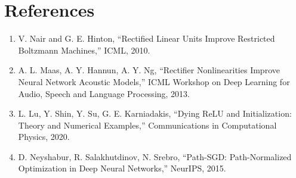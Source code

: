 \documentclass[10pt,journal,compsoc]{IEEEtran}
\begin{document}
\section*{References}
\begin{small}
\begin{enumerate}
    \item V. Nair and G. E. Hinton, ``Rectified Linear Units Improve Restricted Boltzmann Machines,'' ICML, 2010.
    \item A. L. Maas, A. Y. Hannun, A. Y. Ng, ``Rectifier Nonlinearities Improve Neural Network Acoustic Models,'' ICML Workshop on Deep Learning for Audio, Speech and Language Processing, 2013.
    \item L. Lu, Y. Shin, Y. Su, G. E. Karniadakis, ``Dying ReLU and Initialization: Theory and Numerical Examples,'' Communications in Computational Physics, 2020.
    \item D. Neyshabur, R. Salakhutdinov, N. Srebro, ``Path-SGD: Path-Normalized Optimization in Deep Neural Networks,'' NeurIPS, 2015.
\end{enumerate}
\end{small}
\end{document}
